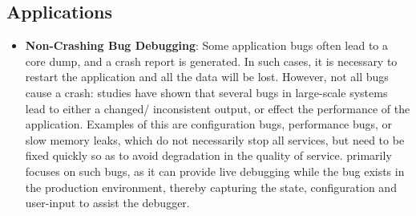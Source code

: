 \subsection{Applications}
\label{sec:impact}


\begin{itemize}[leftmargin=*,topsep=0pt,itemsep=-1ex,partopsep=1ex,parsep=1ex]

\item \textbf{Non-Crashing Bug Debugging}: 
 Some application bugs often lead to a core dump, and a crash report is generated. 
 In such cases, it is necessary to restart the application and all the data will be lost.
 However,  not all bugs cause a crash: studies have shown \cite{Zhang:2013:ADS:2486788.2486830, liu2005mining, kremenek2007factor} that several bugs in large-scale systems lead to either a changed/ inconsistent output, or effect the performance of the application.
 Examples of this are configuration bugs, performance bugs, or slow memory leaks, which do not necessarily stop all services, but need to be fixed quickly so as to avoid degradation in the quality of service.
 \parikshan primarily focuses on such bugs, as it can provide live debugging while the bug exists in the production environment, thereby capturing the state, configuration and user-input to assist the debugger.


\end{itemize}
